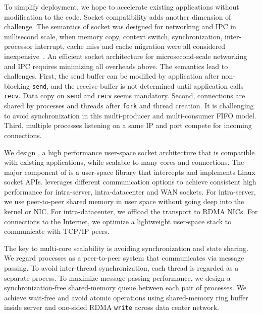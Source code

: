 
To simplify deployment, we hope to accelerate existing applications without modification to the code. Socket compatibility adds another dimension of challenge. The semantics of socket was designed for networking and IPC in millisecond scale, when memory copy, context switch, synchronization, inter-processor interrupt, cache miss and cache migration were all considered inexpensive~\cite{barroso2017attack}. An efficient socket architecture for microsecond-scale networking and IPC requires minimizing all overheads above. The semantics lead to challenges. First, the send buffer can be modified by application after non-blocking \texttt{send}, and the receive buffer is not determined until application calls \texttt{recv}. Data copy on \texttt{send} and \texttt{recv} seems mandatory. Second, connections are shared by processes and threads after \texttt{fork} and thread creation. It is challenging to avoid synchronization in this multi-producer and multi-consumer FIFO model. Third, multiple processes listening on a same IP and port compete for incoming connections.


We design \sys{}, a high performance user-space socket architecture that is compatible with existing applications, while scalable to many cores and connections. The major component of \sys{} is a user-space library \libipc{} that intercepts and implements Linux socket APIs. \libipc{} leverages different communication options to achieve consistent high performance for intra-server, intra-datacenter and WAN sockets. For intra-server, we use peer-to-peer shared memory in user space without going deep into the kernel or NIC. For intra-datacenter, we offload the transport to RDMA NICs. For connections to the Internet, we optimize a lightweight user-space stack to communicate with TCP/IP peers.

The key to multi-core scalability is avoiding synchronization and state sharing. We regard processes as a peer-to-peer system that communicates via message passing. To avoid inter-thread synchronization, each thread is regarded as a separate process. To maximize message passing performance, we design a synchronization-free shared-memory queue between each pair of processes. We achieve wait-free and avoid atomic operations using shared-memory ring buffer inside server and one-sided RDMA \texttt{write} across data center network.

